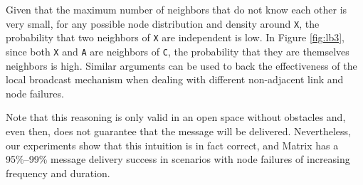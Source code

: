 Given that the maximum number of neighbors that do not know each other is very small, for any possible node distribution and density around \texttt{X}, the probability that two neighbors of \texttt{X} are independent is low. In Figure \ref{fig:lb3}, since both \texttt{X} and \texttt{A} are neighbors of \texttt{C}, the probability that they are themselves neighbors is high. Similar arguments can be used to back the effectiveness of the local broadcast mechanism when dealing with different non-adjacent link and node failures.

Note that this reasoning is only valid in an open space without obstacles and, even then, does not guarantee that the message will be delivered. Nevertheless, our experiments show that this intuition is in fact correct, and Matrix has a 95\%--99\% message delivery success in scenarios with node failures of increasing frequency and duration. 